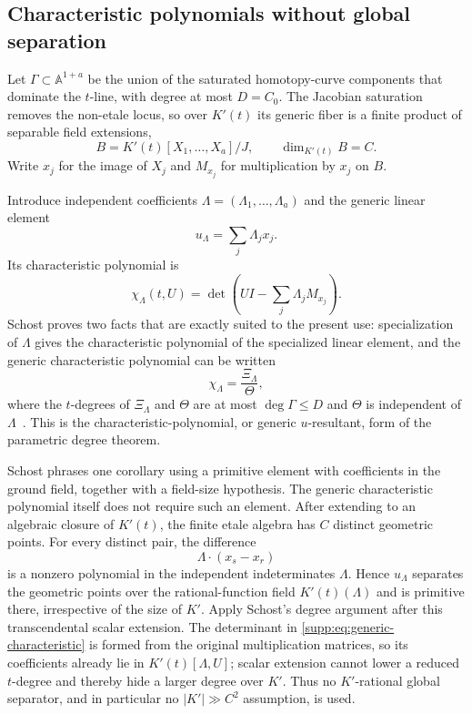 \documentclass[11pt,a4paper]{article}
\theoremstyle{definition}
\theoremstyle{remark}
\begin{document}
\subsection{Characteristic polynomials without global separation}\label{supp:sec:charpoly}

Let $\Gamma\subset\mathbb A^{1+a}$ be the union of the saturated homotopy-curve components that dominate the $t$-line, with degree at most $D=C_0$.  The Jacobian saturation removes the non-etale locus, so over $K'(t)$ its generic fiber is a finite product of separable field extensions,
\[
 B=K'(t)[X_1,\ldots,X_a]/J,
 \qquad \dim_{K'(t)}B=C.
\]
Write $x_j$ for the image of $X_j$ and $M_{x_j}$ for multiplication by $x_j$ on $B$.

Introduce independent coefficients $\Lambda=(\Lambda_1,\ldots,\Lambda_a)$ and the generic linear element
\[
 u_\Lambda=\sum_j\Lambda_jx_j.
\]
Its characteristic polynomial is
\begin{equation}\label{supp:eq:generic-characteristic}
 \chi_\Lambda(t,U)
 =\det\!\left(UI-\sum_j\Lambda_jM_{x_j}\right).
\end{equation}
Schost proves two facts that are exactly suited to the present use: specialization of $\Lambda$ gives the characteristic polynomial of the specialized linear element, and the generic characteristic polynomial can be written
\[
 \chi_\Lambda=\frac{\Xi_\Lambda}{\Theta},
\]
where the $t$-degrees of $\Xi_\Lambda$ and $\Theta$ are at most $\deg\Gamma\le D$ and $\Theta$ is independent of $\Lambda$~\cite[Lemmas~2--3 and Proposition~2]{Schost2003}.  This is the characteristic-polynomial, or generic $u$-resultant, form of the parametric degree theorem.

Schost phrases one corollary using a primitive element with coefficients in the ground field, together with a field-size hypothesis.  The generic characteristic polynomial itself does not require such an element.  After extending to an algebraic closure of $K'(t)$, the finite etale algebra has $C$ distinct geometric points.  For every distinct pair, the difference
\[
 \Lambda\cdot(x_s-x_r)
\]
is a nonzero polynomial in the independent indeterminates $\Lambda$.  Hence $u_\Lambda$ separates the geometric points over the rational-function field $K'(t)(\Lambda)$ and is primitive there, irrespective of the size of $K'$.  Apply Schost's degree argument after this transcendental scalar extension.  The determinant in \eqref{supp:eq:generic-characteristic} is formed from the original multiplication matrices, so its coefficients already lie in $K'(t)[\Lambda,U]$; scalar extension cannot lower a reduced $t$-degree and thereby hide a larger degree over $K'$.  Thus no $K'$-rational global separator, and in particular no $|K'|\gg C^2$ assumption, is used.
\end{document}
